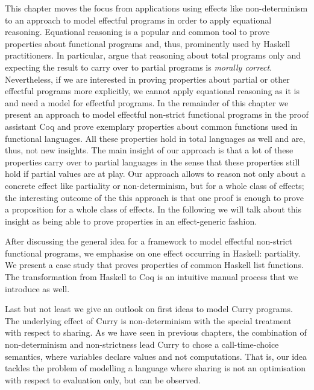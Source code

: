 
This chapter moves the focus from applications using effects like
non-determinism to an approach to model effectful programs in order to
apply equational reasoning.
Equational reasoning is a popular and common tool to prove properties
about functional programs and, thus, prominently used by Haskell
practitioners. 
In particular, \citet{danielsson2006fast} argue that reasoning about
total programs only and expecting the result to carry over to partial
programs is \textit{morally correct}.
Nevertheless, if we are interested in proving properties about partial
or other effectful programs more explicitly, we cannot apply
equational reasoning as it is and need a model for effectful programs.
In the remainder of this chapter we present an approach to model
effectful non-strict functional programs in the proof assistant Coq
and prove exemplary properties about common functions used in
functional languages.
All these properties hold in total languages as well and are, thus,
not new insights.
The main insight of our approach is that a lot of these properties
carry over to partial languages in the sense that these properties
still hold if partial values are at play.
Our approach allows to reason not only about a concrete
effect like partiality or non-determinism, but for a whole class of effects; the
interesting outcome of the this approach is that one proof is
enough to prove a proposition for a whole class of effects.
In the following we will talk about this insight as being able to
prove properties in an effect-generic fashion.

After discussing the general idea for a framework to model effectful
non-strict functional programs, we emphasise on one effect occurring
in Haskell: partiality.
We present a case study that proves properties of common Haskell list
functions.
The transformation from Haskell to Coq is an intuitive manual
process that we introduce as well.

Last but not least we give an outlook on first ideas to model Curry
programs.
The underlying effect of Curry is non-determinism with the special
treatment with respect to sharing.
As we have seen in previous chapters, the combination of
non-determinism and non-strictness lead Curry to chose a
call-time-choice semantics, where variables declare values and not computations.
That is, our idea tackles the problem of modelling a language where
sharing is not an optimisation with respect to evaluation only, but
can be observed.

